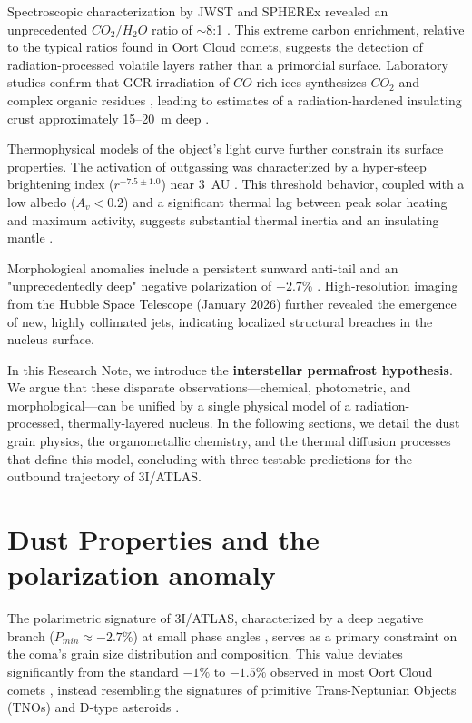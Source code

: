 \documentclass[reprint,aps,prd,noshowpacs]{revtex4-2}
\begin{document}
Spectroscopic characterization by JWST and SPHEREx revealed an unprecedented $CO_2/H_2O$ ratio of $\sim$8:1 \cite{Maggiolo_2026}. This extreme carbon enrichment, relative to the typical ratios found in Oort Cloud comets, suggests the detection of radiation-processed volatile layers rather than a primordial surface. Laboratory studies confirm that GCR irradiation of $CO$-rich ices synthesizes $CO_2$ and complex organic residues \cite{Hudson2001}, leading to estimates of a radiation-hardened insulating crust approximately 15--20~m deep \cite{trigo2025}.

Thermophysical models of the object’s light curve further constrain its surface properties. The activation of outgassing was characterized by a hyper-steep brightening index ($r^{-7.5 \pm 1.0}$) near 3~AU \cite{zhang2025}. This threshold behavior, coupled with a low albedo ($A_v < 0.2$) and a significant thermal lag between peak solar heating and maximum activity, suggests substantial thermal inertia and an insulating mantle \cite{yaginuma2025, neukart2025}.

Morphological anomalies include a persistent sunward anti-tail \cite{scarmato2025} and an "unprecedentedly deep" negative polarization of $-2.7\%$ \cite{gray2025}. High-resolution imaging from the Hubble Space Telescope (January 2026) further revealed the emergence of new, highly collimated jets, indicating localized structural breaches in the nucleus surface.

In this Research Note, we introduce the \textbf{interstellar permafrost hypothesis}. We argue that these disparate observations—chemical, photometric, and morphological—can be unified by a single physical model of a radiation-processed, thermally-layered nucleus. In the following sections, we detail the dust grain physics, the organometallic chemistry, and the thermal diffusion processes that define this model, concluding with three testable predictions for the outbound trajectory of 3I/ATLAS.

\section{Dust Properties and the polarization anomaly}

The polarimetric signature of 3I/ATLAS, characterized by a deep negative branch ($P_{min} \approx -2.7\%$) at small phase angles \cite{gray2025}, serves as a primary constraint on the coma's grain size distribution and composition. This value deviates significantly from the standard $-1\%$ to $-1.5\%$ observed in most Oort Cloud comets \cite{Kiselev2015}, instead resembling the signatures of primitive Trans-Neptunian Objects (TNOs) and D-type asteroids \cite{Bagnulo2008}.
\end{document}
